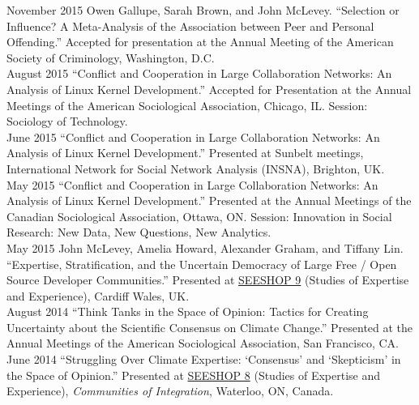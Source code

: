 \documentclass[9pt,usenames,dvipsnames]{article}
\begin{document}


\ind November 2015 Owen Gallupe, Sarah Brown, and John McLevey. ``Selection or Influence? A Meta-Analysis of the Association between Peer and Personal Offending.'' Accepted for presentation at the Annual Meeting of the American Society of Criminology, Washington, D.C.\\

\ind August 2015 ``Conflict and Cooperation in Large Collaboration Networks: An Analysis of Linux Kernel Development.'' Accepted for Presentation at the Annual Meetings of the American Sociological Association, Chicago, IL. Session: Sociology of Technology. \\

\ind June 2015 ``Conflict and Cooperation in Large Collaboration Networks: An Analysis of Linux Kernel Development.'' Presented at Sunbelt meetings, International Network for Social Network Analysis (INSNA), Brighton, UK. \\

\ind May 2015 ``Conflict and Cooperation in Large Collaboration Networks: An Analysis of Linux Kernel Development.'' Presented at the Annual Meetings of the Canadian Sociological Association, Ottawa, ON. Session: Innovation in Social Research: New Data, New Questions, New Analytics.\\

\ind May 2015 John McLevey, Amelia Howard, Alexander Graham, and Tiffany Lin. ``Expertise, Stratification, and the Uncertain Democracy of Large Free / Open Source Developer Communities.'' Presented at \href{http://www.cf.ac.uk/socsi/contactsandpeople/harrycollins/expertise-project/seeshophome.html}{SEESHOP 9} (Studies of Expertise and Experience), Cardiff Wales, UK. \\

\ind August 2014 ``Think Tanks in the Space of Opinion: Tactics for Creating Uncertainty about the Scientific Consensus on Climate Change.'' Presented at the Annual Meetings of the American Sociological Association, San Francisco, CA. \\

\ind June 2014 ``Struggling Over Climate Expertise: `Consensus' and `Skepticism' in the Space of Opinion.'' Presented at \href{http://www.cf.ac.uk/socsi/contactsandpeople/harrycollins/expertise-project/seeshophome.html}{SEESHOP 8} (Studies of Expertise and Experience), \emph{Communities of Integration}, Waterloo, ON, Canada. \\
\end{document}
